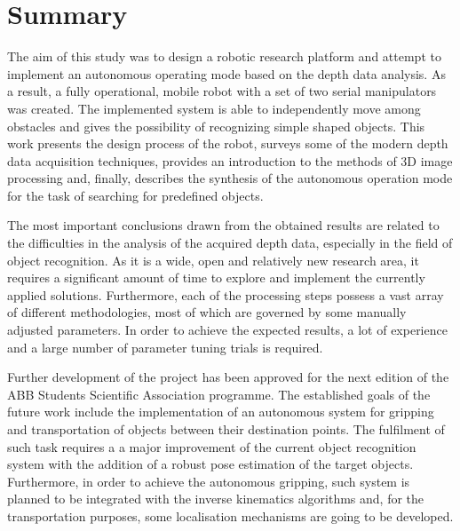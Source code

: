 \chapter*{Summary}
\label{cha:summary}

The aim of this study was to design a robotic research platform and attempt to implement an autonomous operating mode based on the depth data analysis. As a result, a fully operational, mobile robot with a set of two serial manipulators was created. The implemented system is able to independently move among obstacles and gives the possibility of recognizing simple shaped objects. This work presents the design process of the robot, surveys some of the modern depth data acquisition techniques, provides an introduction to the methods of 3D image processing and, finally, describes the synthesis of the autonomous operation mode for the task of searching for predefined objects. 

The most important conclusions drawn from the obtained results are related to the difficulties in the analysis of the acquired depth data, especially in the field of object recognition. As it is a wide, open and relatively new research area, it requires a significant amount of time to explore and implement the currently applied solutions. Furthermore, each of the processing steps possess a vast array of different methodologies, most of which are governed by some manually adjusted parameters. In order to achieve the expected results, a lot of experience and a large number of parameter tuning trials is required.

Further development of the project has been approved for the next edition of the ABB Students Scientific Association programme. The established goals of the future work include the implementation of an autonomous system for gripping and transportation of objects between their destination points. The fulfilment of such task requires a a major improvement of the current object recognition system with the addition of a robust pose estimation of the target objects. Furthermore, in order to achieve the autonomous gripping, such system is planned to be integrated with the inverse kinematics algorithms and,  for the transportation purposes, some localisation mechanisms are going to be developed.